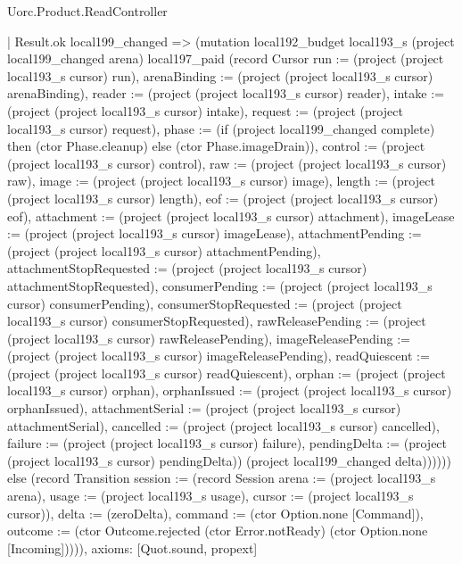 \begin{lexlean}{Uorc.Product.ReadController}
\begin{semanticmodule}
{        | Result.ok local199_changed => (mutation local192_budget local193_s (project local199_changed arena) local197_paid (record Cursor {run := (project (project local193_s cursor) run), arenaBinding := (project (project local193_s cursor) arenaBinding), reader := (project (project local193_s cursor) reader), intake := (project (project local193_s cursor) intake), request := (project (project local193_s cursor) request), phase := (if (project local199_changed complete) then (ctor Phase.cleanup) else (ctor Phase.imageDrain)), control := (project (project local193_s cursor) control), raw := (project (project local193_s cursor) raw), image := (project (project local193_s cursor) image), length := (project (project local193_s cursor) length), eof := (project (project local193_s cursor) eof), attachment := (project (project local193_s cursor) attachment), imageLease := (project (project local193_s cursor) imageLease), attachmentPending := (project (project local193_s cursor) attachmentPending), attachmentStopRequested := (project (project local193_s cursor) attachmentStopRequested), consumerPending := (project (project local193_s cursor) consumerPending), consumerStopRequested := (project (project local193_s cursor) consumerStopRequested), rawReleasePending := (project (project local193_s cursor) rawReleasePending), imageReleasePending := (project (project local193_s cursor) imageReleasePending), readQuiescent := (project (project local193_s cursor) readQuiescent), orphan := (project (project local193_s cursor) orphan), orphanIssued := (project (project local193_s cursor) orphanIssued), attachmentSerial := (project (project local193_s cursor) attachmentSerial), cancelled := (project (project local193_s cursor) cancelled), failure := (project (project local193_s cursor) failure), pendingDelta := (project (project local193_s cursor) pendingDelta)}) (project local199_changed delta)))))) else (record Transition {session := (record Session {arena := (project local193_s arena), usage := (project local193_s usage), cursor := (project local193_s cursor)}), delta := (zeroDelta), command := (ctor Option.none [Command]), outcome := (ctor Outcome.rejected (ctor Error.notReady) (ctor Option.none [Incoming]))})),
  axioms: [Quot.sound, propext]
}


\end{semanticmodule}
\end{lexlean}
